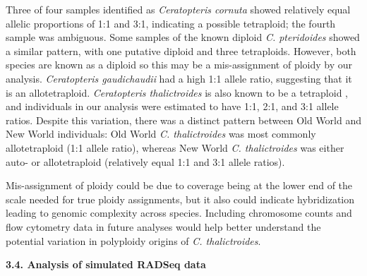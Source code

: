 \documentclass[12pt]{article}
\begin{document}
\begin{flushleft}
Three of four samples identified as \textit{Ceratopteris cornuta} showed relatively equal allelic proportions of 1:1 and 3:1, indicating a possible tetraploid; the fourth sample was ambiguous. Some samples of the known diploid \textit{C. pteridoides} showed a similar pattern, with one putative diploid and three tetraploids. However, both species are known as a diploid so this may be a mis-assignment of ploidy by our analysis. \textit{Ceratopteris gaudichaudii} had a high 1:1 allele ratio, suggesting that it is an allotetraploid. \textit{Ceratopteris thalictroides} is also known to be a tetraploid \autocite{LloydTax1974, Masuyama2010}, and individuals in our analysis were estimated to have 1:1, 2:1, and 3:1 allele ratios. Despite this variation, there was a distinct pattern between Old World and New World individuals: Old World \textit{C. thalictroides} was most commonly allotetraploid (1:1 allele ratio), whereas New World \textit{C. thalictroides} was either auto- or allotetraploid (relatively equal 1:1 and 3:1 allele ratios). 

Mis-assignment of ploidy could be due to coverage being at the lower end of the scale needed for true ploidy assignments, but it also could indicate hybridization leading to genomic complexity across species. Including chromosome counts and flow cytometry data in future analyses would help better understand the potential variation in polyploidy origins of \textit{C. thalictroides}.

\textbf{3.4. Analysis of simulated RADSeq data}


\end{flushleft}
\end{document}
